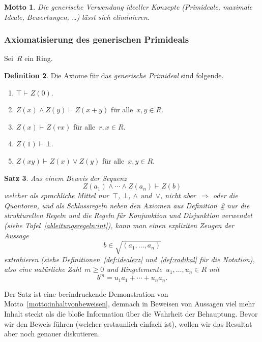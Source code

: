 \documentclass[a4paper,ngerman,12pt]{scrartcl}
\theoremstyle{definition}
\newtheorem{defn}{Definition}[section]
\theoremstyle{plain}
\newtheorem{motto}[defn]{Motto}
\newtheorem{satz}[defn]{Satz}
\theoremstyle{remark}
\newcommand{\seq}[1]{\mathrel{\vdash\!\!\!_{#1}}}
\renewcommand{\_}{\mathpunct{.}\,}
\newcommand{\?}{\,{:}\,}
\begin{document}
\begin{motto}Die \emph{generische} Verwendung ideeller Konzepte (Primideale,
maximale Ideale, Bewertungen, \ldots) lässt sich eliminieren.\end{motto}


\subsubsection*{Axiomatisierung des generischen Primideals}

Sei~$R$ ein Ring.

\begin{defn}\label{defn:genprime}Die Axiome für das \emph{generische Primideal}
sind folgende.
\begin{enumerate}
\item[1.] $\top \seq{} Z(0).$
\item[2.] $Z(x) \wedge Z(y) \seq{} Z(x+y)$ für alle~$x,y \in R$.
\item[3.] $Z(x) \seq{} Z(rx)$ für alle~$r,x \in R$.
\item[4.] $Z(1) \seq{} \bot.$
\item[5.] $Z(xy) \seq{} Z(x) \vee Z(y)$ für alle~$x,y \in R$.
\end{enumerate}
\end{defn}

\begin{satz}\label{satz:genprime}Aus einem Beweis der Sequenz
\[ Z(a_1) \wedge \cdots \wedge Z(a_n) \seq{} Z(b) \]
welcher als sprachliche Mittel nur~$\top$, $\bot$, $\wedge$ und~$\vee$, nicht
aber~$\Rightarrow$ oder die Quantoren, und als Schlussregeln neben den Axiomen
aus Definition~\ref{defn:genprime} nur die
strukturellen Regeln und die Regeln für Konjunktion und Disjunktion verwendet (siehe
Tafel~\ref{ableitungsregeln:int}), kann man einen expliziten Zeugen der Aussage
\[ b \in \sqrt{(a_1,\ldots,a_n)} \]
extrahieren (siehe Definitionen~\ref{def:idealerz} und~\ref{def:radikal} für
die Notation), also eine natürliche Zahl~$m \geq 0$ und
Ringelemente~$u_1,\ldots,u_n \in R$ mit
\[ b^m = u_1 a_1 + \cdots + u_n a_n. \]
\end{satz}

Der Satz ist eine beeindruckende
Demonstration von Motto~\ref{motto:inhaltvonbeweisen}, demnach in
Beweisen von Aussagen viel mehr Inhalt steckt als die bloße Information
über die Wahrheit der Behauptung. Bevor wir den Beweis führen (welcher
erstaunlich einfach ist), wollen wir das Resultat aber noch genauer
diskutieren.
\end{document}
